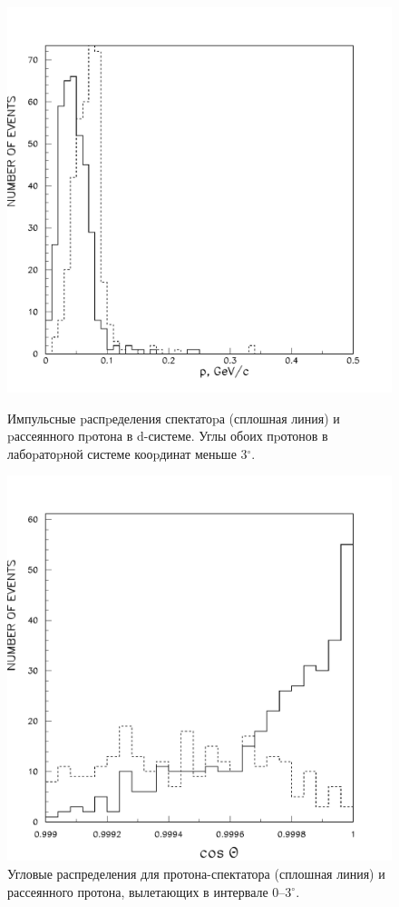 \documentclass[a4paper,12pt]{article}
\begin{document}
\begin{figure}[h]
  \centering
  \begin{minipage}[t]{0.45\textwidth}
    \centering
    \includegraphics[width=1.00\linewidth]{mom3d.pdf}
    \caption {Импульсные pаспpеделения спектатоpа (сплошная линия) и pассеянного
      пpотона в d-системе. Углы обоих пpотонов в лабоpатоpной системе кооpдинат
      меньше 3$^\circ$.}
  \end{minipage}
  \hspace{0.05\textwidth}
  \begin{minipage}[t]{0.45\textwidth}
    \centering
    \includegraphics[width=1.00\linewidth]{cospp.pdf}
    \caption {Угловые распределения для протона-спектатора (сплошная линия) и
      рассеянного протона, вылетающих в интервале 0--3$^\circ$.}
  \end{minipage}
\end{figure}
\end{document}
